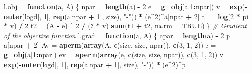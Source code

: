 \documentclass[]{article}
\newenvironment{Shaded}{\begin{snugshade}}{\end{snugshade}}
\newcommand{\CommentTok}[1]{\textcolor[rgb]{0.56,0.35,0.01}{\textit{#1}}}
\newcommand{\ControlFlowTok}[1]{\textcolor[rgb]{0.13,0.29,0.53}{\textbf{#1}}}
\newcommand{\DataTypeTok}[1]{\textcolor[rgb]{0.13,0.29,0.53}{#1}}
\newcommand{\DecValTok}[1]{\textcolor[rgb]{0.00,0.00,0.81}{#1}}
\newcommand{\KeywordTok}[1]{\textcolor[rgb]{0.13,0.29,0.53}{\textbf{#1}}}
\newcommand{\NormalTok}[1]{#1}
\newcommand{\OperatorTok}[1]{\textcolor[rgb]{0.81,0.36,0.00}{\textbf{#1}}}
\newcommand{\OtherTok}[1]{\textcolor[rgb]{0.56,0.35,0.01}{#1}}
\newcommand{\StringTok}[1]{\textcolor[rgb]{0.31,0.60,0.02}{#1}}
\begin{document}
\begin{Shaded}
\begin{Highlighting}[]
\NormalTok{l.obj =}\StringTok{ }\ControlFlowTok{function}\NormalTok{(a, A) \{}
\NormalTok{  npar =}\StringTok{ }\KeywordTok{length}\NormalTok{(a) }\OperatorTok{-}\StringTok{ }\DecValTok{2}
\NormalTok{  e =}\StringTok{ }\KeywordTok{g_obj}\NormalTok{(a[}\DecValTok{1}\OperatorTok{:}\NormalTok{npar])}
\NormalTok{  v =}\StringTok{ }\KeywordTok{exp}\NormalTok{(}\OperatorTok{-}\KeywordTok{outer}\NormalTok{(logd[, }\DecValTok{1}\NormalTok{], }\KeywordTok{rep}\NormalTok{(a[npar }\OperatorTok{+}\StringTok{ }\DecValTok{1}\NormalTok{], size), }\StringTok{"-"}\NormalTok{)) }\OperatorTok{*}\StringTok{ }\NormalTok{(e}\OperatorTok{^}\DecValTok{2}\NormalTok{)}\OperatorTok{^}\NormalTok{a[npar }\OperatorTok{+}\StringTok{ }\DecValTok{2}\NormalTok{]}
\NormalTok{  t1 =}\StringTok{ }\KeywordTok{log}\NormalTok{(}\DecValTok{2} \OperatorTok{*}\StringTok{ }\NormalTok{pi }\OperatorTok{*}\StringTok{ }\NormalTok{v) }\OperatorTok{/}\StringTok{ }\DecValTok{2}
\NormalTok{  t2 =}\StringTok{ }\NormalTok{(A }\OperatorTok{-}\StringTok{ }\NormalTok{e) }\OperatorTok{^}\StringTok{ }\DecValTok{2} \OperatorTok{/}\StringTok{ }\NormalTok{(}\DecValTok{2} \OperatorTok{*}\StringTok{ }\NormalTok{v)}
  \KeywordTok{sum}\NormalTok{(t1 }\OperatorTok{+}\StringTok{ }\NormalTok{t2, }\DataTypeTok{na.rm =} \OtherTok{TRUE}\NormalTok{)}
\NormalTok{\}}
\CommentTok{# Gradient of the objective function}
\NormalTok{l.grad =}\StringTok{ }\ControlFlowTok{function}\NormalTok{(a, A) \{}
\NormalTok{  npar =}\StringTok{ }\KeywordTok{length}\NormalTok{(a) }\OperatorTok{-}\StringTok{ }\DecValTok{2}
\NormalTok{  p =}\StringTok{ }\NormalTok{a[npar }\OperatorTok{+}\StringTok{ }\DecValTok{2}\NormalTok{]}
\NormalTok{  Av =}\StringTok{ }\KeywordTok{aperm}\NormalTok{(}\KeywordTok{array}\NormalTok{(A, }\KeywordTok{c}\NormalTok{(size, size, npar)), }\KeywordTok{c}\NormalTok{(}\DecValTok{3}\NormalTok{, }\DecValTok{1}\NormalTok{, }\DecValTok{2}\NormalTok{))}
\NormalTok{  e =}\StringTok{ }\KeywordTok{g_obj}\NormalTok{(a[}\DecValTok{1}\OperatorTok{:}\NormalTok{npar])}
\NormalTok{  ev =}\StringTok{ }\KeywordTok{aperm}\NormalTok{(}\KeywordTok{array}\NormalTok{(e, }\KeywordTok{c}\NormalTok{(size, size, npar)), }\KeywordTok{c}\NormalTok{(}\DecValTok{3}\NormalTok{, }\DecValTok{1}\NormalTok{, }\DecValTok{2}\NormalTok{))}
\NormalTok{  v =}\StringTok{ }\KeywordTok{exp}\NormalTok{(}\OperatorTok{-}\KeywordTok{outer}\NormalTok{(logd[, }\DecValTok{1}\NormalTok{], }\KeywordTok{rep}\NormalTok{(a[npar }\OperatorTok{+}\StringTok{ }\DecValTok{1}\NormalTok{], size), }\StringTok{"-"}\NormalTok{)) }\OperatorTok{*}\StringTok{ }\NormalTok{(e}\OperatorTok{^}\DecValTok{2}\NormalTok{)}\OperatorTok{^}\NormalTok{p}

\end{Highlighting}
\end{Shaded}
\end{document}

